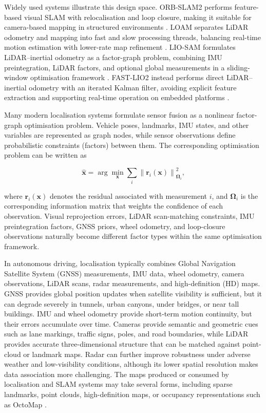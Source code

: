 \documentclass[11pt,oneside,openany]{book}
\begin{document}
Widely used systems illustrate this design space. ORB-SLAM2 performs feature-based visual SLAM with relocalisation and loop closure, making it suitable for camera-based mapping in structured environments \cite{murartal2017_orbslam2}. LOAM separates LiDAR odometry and mapping into fast and slow processing threads, balancing real-time motion estimation with lower-rate map refinement \cite{zhang2014_loam}. LIO-SAM formulates LiDAR--inertial odometry as a factor-graph problem, combining IMU preintegration, LiDAR factors, and optional global measurements in a sliding-window optimisation framework \cite{shan2020_liosam}. FAST-LIO2 instead performs direct LiDAR--inertial odometry with an iterated Kalman filter, avoiding explicit feature extraction and supporting real-time operation on embedded platforms \cite{xu2022_fastlio2}.

Many modern localisation systems formulate sensor fusion as a nonlinear factor-graph optimisation problem. Vehicle poses, landmarks, IMU states, and other variables are represented as graph nodes, while sensor observations define probabilistic constraints (factors) between them. The corresponding optimisation problem can be written as

\begin{equation}
\hat{\mathbf{x}}
=
\arg\min_{\mathbf{x}}
\sum_i
\left\|
\mathbf{r}_i(\mathbf{x})
\right\|_{\mathbf{\Omega}_i}^{2},
\label{eq:factor_graph}
\end{equation}

where $\mathbf{r}_i(\mathbf{x})$ denotes the residual associated with measurement $i$, and $\mathbf{\Omega}_i$ is the corresponding information matrix that weights the confidence of each observation. Visual reprojection errors, LiDAR scan-matching constraints, IMU preintegration factors, GNSS priors, wheel odometry, and loop-closure observations naturally become different factor types within the same optimisation framework.

In autonomous driving, localisation typically combines Global Navigation Satellite System (GNSS) measurements, IMU data, wheel odometry, camera observations, LiDAR scans, radar measurements, and high-definition (HD) maps. GNSS provides global position updates when satellite visibility is sufficient, but it can degrade severely in tunnels, urban canyons, under bridges, or near tall buildings. IMU and wheel odometry provide short-term motion continuity, but their errors accumulate over time. Cameras provide semantic and geometric cues such as lane markings, traffic signs, poles, and road boundaries, while LiDAR provides accurate three-dimensional structure that can be matched against point-cloud or landmark maps. Radar can further improve robustness under adverse weather and low-visibility conditions, although its lower spatial resolution makes data association more challenging. The maps produced or consumed by localisation and SLAM systems may take several forms, including sparse landmarks, point clouds, high-definition maps, or occupancy representations such as OctoMap \cite{hornung2013_octomap}.
\end{document}

